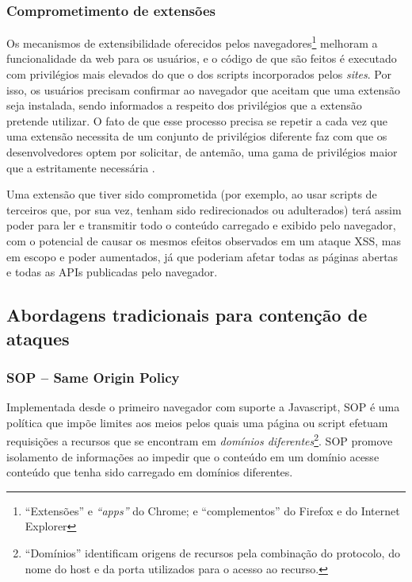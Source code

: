 \subsubsection{Comprometimento de extensões}

Os mecanismos de extensibilidade oferecidos pelos navegadores\footnote{``Extensões'' e \textit{``apps''} do Chrome; e ``complementos'' do Firefox e do Internet Explorer} melhoram a funcionalidade da web para os usuários, e o código de que são feitos é executado com privilégios mais elevados do que o dos scripts incorporados pelos \textit{sites}. Por isso, os usuários precisam confirmar ao navegador que aceitam que uma extensão seja instalada, sendo informados a respeito dos privilégios que a extensão pretende utilizar. O fato de que esse processo precisa se repetir a cada vez que uma extensão necessita de um conjunto de privilégios diferente faz com que os desenvolvedores optem por solicitar, de antemão, uma gama de privilégios maior que a estritamente necessária \cite{Heule2015_Most_Dangerous_Code}.

Uma extensão que tiver sido comprometida (por exemplo, ao usar scripts de terceiros que, por sua vez, tenham sido redirecionados ou adulterados) terá assim poder para ler e transmitir todo o conteúdo carregado e exibido pelo navegador, com o potencial de causar os mesmos efeitos observados em um ataque XSS, mas em escopo e poder aumentados, já que poderiam afetar todas as páginas abertas e todas as APIs publicadas pelo navegador.

\subsection{Abordagens tradicionais para contenção de ataques}

\subsubsection{SOP -- Same Origin Policy}
Implementada desde o primeiro navegador com suporte a Javascript, SOP \cite{W3C:SOP} é uma política que impõe limites aos meios pelos quais uma página ou script efetuam requisições a recursos que se encontram em \textit{domínios diferentes}\footnote{``Domínios'' identificam origens de recursos pela combinação do protocolo, do nome do host e da porta utilizados para o acesso ao recurso.}. SOP promove isolamento de informações ao impedir que o conteúdo em um domínio acesse conteúdo que tenha sido carregado em domínios diferentes.

